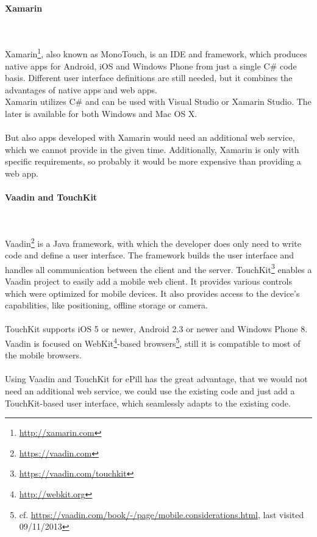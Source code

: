 \paragraph{Xamarin}$\;$

\vspace{0.75em}
Xamarin\footnote{\url{http://xamarin.com}}, also known as MonoTouch, is an IDE and framework, which produces native apps for Android, iOS and Windows Phone from just a single C\# code basis. Different user interface definitions are still needed, but it combines the advantages of native apps and web apps. 
\\
Xamarin utilizes C\# and can be used with Visual Studio or Xamarin Studio. The later is available for both Windows and Mac OS X.
\\
\\
But also apps developed with Xamarin would need an additional web service, which we cannot provide in the given time. Additionally, Xamarin is only with specific requirements, so probably it would be more expensive than providing a web app.

\paragraph{Vaadin and TouchKit}$\;$

\vspace{0.75em}
Vaadin\footnote{\url{https://vaadin.com}} is a Java framework, with which the developer does only need to write code and define a user interface. The framework builds the user interface and handles all communication between the client and the server. TouchKit\footnote{\url{https://vaadin.com/touchkit}} enables a Vaadin project to easily add a mobile web client. It provides various controls which were optimized for mobile devices. It also provides access to the device's capabilities, like positioning, offline storage or camera.
\\
\\
TouchKit supports iOS 5 or newer, Android 2.3 or newer and Windows Phone 8. Vaadin is focused on WebKit\footnote{\url{http://webkit.org}}-based browsers\footnote{cf. \url{https://vaadin.com/book/-/page/mobile.considerations.html}, last visited 09/11/2013}, still it is compatible to most of the mobile browsers.
\\
\\
Using Vaadin and TouchKit for ePill has the great advantage, that we would not need an additional web service, we could use the existing code and just add a TouchKit-based user interface, which seamlessly adapts to the existing code.

